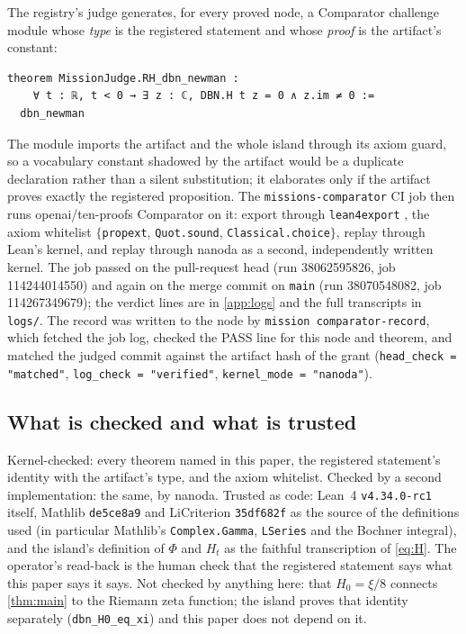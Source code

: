 \documentclass[11pt]{article}
\theoremstyle{definition}
\newcommand{\lean}[1]{\texttt{#1}}
\newcommand{\Hfun}{H}
\begin{document}
The registry's judge generates, for every proved node, a Comparator challenge module whose \emph{type} is the registered statement and whose \emph{proof} is the artifact's constant:

\begin{lstlisting}
theorem MissionJudge.RH_dbn_newman :
    ∀ t : ℝ, t < 0 → ∃ z : ℂ, DBN.H t z = 0 ∧ z.im ≠ 0 :=
  dbn_newman
\end{lstlisting}

\noindent
The module imports the artifact and the whole island through its axiom guard, so a vocabulary constant shadowed by the artifact would be a duplicate declaration rather than a silent substitution; it elaborates only if the artifact proves exactly the registered proposition. The \lean{missions-comparator} CI job then runs openai/ten-proofs Comparator \cite{Comparator} on it: export through \lean{lean4export} \cite{l4x}, the axiom whitelist $\{$\lean{propext}, \lean{Quot.sound}, \lean{Classical.choice}$\}$, replay through Lean's kernel, and replay through nanoda \cite{nanoda} as a second, independently written kernel. The job passed on the pull-request head (run 38062595826, job 114244014550) and again on the merge commit on \lean{main} (run 38070548082, job 114267349679); the verdict lines are in \cref{app:logs} and the full transcripts in \lean{logs/}. The record was written to the node by \lean{mission comparator-record}, which fetched the job log, checked the PASS line for this node and theorem, and matched the judged commit against the artifact hash of the grant (\lean{head\_check = "matched"}, \lean{log\_check = "verified"}, \lean{kernel\_mode = "nanoda"}).

\subsection{What is checked and what is trusted}

Kernel-checked: every theorem named in this paper, the registered statement's identity with the artifact's type, and the axiom whitelist. Checked by a second implementation: the same, by nanoda. Trusted as code: Lean~4 \lean{v4.34.0-rc1} itself, Mathlib \lean{de5ce8a9} and LiCriterion \lean{35df682f} as the source of the definitions used (in particular Mathlib's \lean{Complex.Gamma}, \lean{LSeries} and the Bochner integral), and the island's definition of $\Phi$ and $\Hfun_t$ as the faithful transcription of \eqref{eq:H}. The operator's read-back is the human check that the registered statement says what this paper says it says. Not checked by anything here: that $\Hfun_0 = \xi/8$ connects \cref{thm:main} to the Riemann zeta function; the island proves that identity separately (\lean{dbn\_H0\_eq\_xi}) and this paper does not depend on it.
\end{document}
